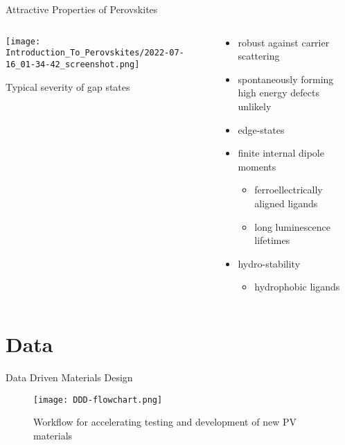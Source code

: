 \documentclass[10pt, aspectratio=169, presentation]{beamer}
\begin{document}
\begin{frame}[label={sec:orga4ecd3c}]{Attractive Properties of Perovskites}
\begin{columns}
\begin{column}{0.5\columnwidth}
\begin{center}
\texttt{[image: Introduction\_To\_Perovskites/2022-07-16\_01-34-42\_screenshot.png]}
\end{center}
Typical severity of gap states
\autocite{mannodi-kanakkithodi-2020-defec-energ}
\end{column}

\begin{column}{0.5\columnwidth}
\begin{itemize}
\item robust against carrier scattering
\autocite{yan-2016-defec-physic}
\item spontaneously forming high energy defects unlikely
\item edge-states
\item finite internal dipole moments
\autocite{hong-2021-layer-edge}
\begin{itemize}
\item ferroellectrically aligned ligands
\item long luminescence lifetimes
\end{itemize}
\item hydro-stability
\autocite{fu-2021-two-dimen}
\begin{itemize}
\item hydrophobic ligands
\end{itemize}
\end{itemize}
\end{column}
\end{columns}
\end{frame}

\section{Data}
\label{sec:orgfdb3e81}
\begin{frame}[label={sec:org3c5c6b5}]{Data Driven Materials Design}
\begin{figure}[htbp]
\centering
\texttt{[image: DDD-flowchart.png]}
\caption{Workflow for accelerating testing and development of new PV materials\autocite{yang-2023-high-throug,pablo-2019-new-front}}
\end{figure}
\end{frame}
\end{document}
